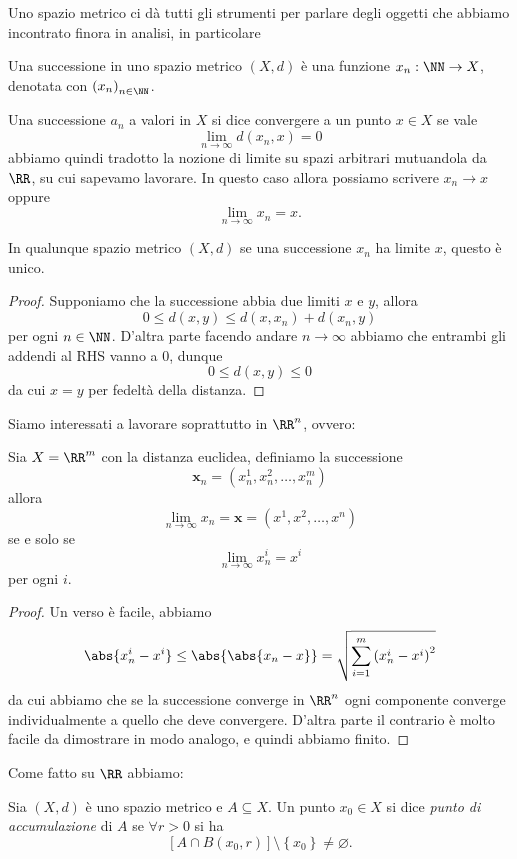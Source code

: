 \documentclass[11pt]{scrartcl}
\newcommand{\eset}{\varnothing}
\begin{document}
	Uno spazio metrico ci dà tutti gli strumenti per parlare degli oggetti che abbiamo incontrato finora in analisi, in particolare 
	\begin{definition}[Successione]
		Una successione in uno spazio metrico $(X,d)$ è una funzione $x_n:\NN\to X$, denotata con $\left(x_n\right)_{n\in\NN}$. 
	\end{definition}
	\begin{definition}[Limite]
		Una successione $a_n$ a valori in $X$ si dice convergere a un punto $x\in X$ se vale
		$$\lim_{n\to\infty}d(x_n,x)=0$$
		abbiamo quindi tradotto la nozione di limite su spazi arbitrari mutuandola da $\RR$, su cui sapevamo lavorare. In questo caso allora possiamo scrivere $x_n\to x$ oppure
		$$\lim_{n\to\infty}x_n = x.$$
	\end{definition}
	\begin{proposition}
		In qualunque spazio metrico $(X,d)$ se una successione $x_n$ ha limite $x$, questo è unico.
	\end{proposition}
	\begin{proof}
		Supponiamo che la successione abbia due limiti $x$ e $y$, allora 
		$$0\le d(x,y)\le d(x,x_n)+d(x_n,y)$$
		per ogni $n\in\NN$. D'altra parte facendo andare $n\to\infty$ abbiamo che entrambi gli addendi al RHS vanno a $0$, dunque 
		$$0\le d(x,y)\le 0$$
		da cui $x=y$ per fedeltà della distanza.
	\end{proof}
	Siamo interessati a lavorare soprattutto in $\RR^n$, ovvero:
	\begin{proposition}[Limiti in $\RR^m$]
		Sia $X=\RR^m$ con la distanza euclidea, definiamo la successione
		$$\mathbf{x}_n=\left(x_n^1,x_n^2,\dots,x_n^m\right)$$
		allora 
		$$\lim_{n\to\infty}x_n={\mathbf{x}}=\left({x}^1,{x}^2,\dots,{x}^n\right)$$
		se e solo se
		$$\lim_{n\to\infty}x_n^i=x^i$$
		per ogni $i$.
	\end{proposition}
	\begin{proof}
		Un verso è facile, abbiamo
		$$\abs{x_n^i-x^i}\le \abs{\abs{x_n-x}}=\sqrt{\sum_{i=1}^{m}\left(x_n^i-x^i\right)^2}$$
		da cui abbiamo che se la successione converge in $\RR^n$ ogni componente converge individualmente a quello che deve convergere. D'altra parte il contrario è molto facile da dimostrare in modo analogo, e quindi abbiamo finito.
	\end{proof}
	Come fatto su $\RR$ abbiamo:
	\begin{definition}
		Sia $(X,d)$ è uno spazio metrico e $A\subseteq X$. Un punto $x_0\in X$ si dice \textit{punto di accumulazione} di $A$ se $\forall r>0$ si ha
		$$\left[A\cap B(x_0,r)\right]\setminus\left\{x_0\right\}\ne \eset.$$
	\end{definition}
\end{document}
